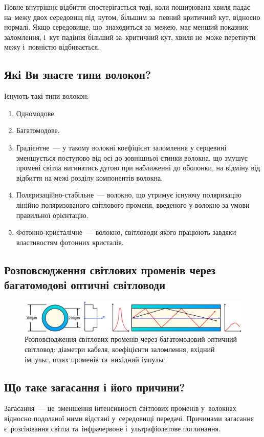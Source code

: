\documentclass[
	a4paper,
	oneside,
	BCOR = 10mm,
	DIV = 12,
	12pt,
	headings = normal,
]{scrartcl}
\begin{document}
			Повне внутрішнє відбиття спостерігається тоді, коли поширювана хвиля падає на~межу двох середовищ під~кутом, більшим за~певний критичний кут, відносно нормалі. Якщо середовище, що~знаходиться за~межею, має менший показник заломлення, і~кут падіння більший за~критичний кут, хвиля не~може перетнути межу і~повністю відбивається.

		\subsection{Які Ви знаєте типи волокон?}
			Існують такі типи волокон:
			\begin{enumerate}[noitemsep]
				\item Одномодове.
				\item Багатомодове.
				\item Градієнтне~— у такому волокні коефіцієнт заломлення у серцевині зменшується поступово від осі до зовнішньої стинки волокна, що змушує промені світла вигинатись дугою при наближенні до оболонки, на відміну від відбиття на межі розділу компонентів волокна.
				\item Поляризаційно-стабільне~— волокно, що утримує існуючу поляризацію лінійно поляризованого світлового променя, введеного у волокно за умови правильної орієнтацію.
				\item Фотонно-кристалічне~— волокно, світловоди якого працюють завдяки властивостям фотонних кристалів.
			\end{enumerate}

		\subsection{Розповсюдження світлових променів через багатомодові оптичні світловоди}
			\begin{figure}[!htbp]
				\centering
				\includegraphics[height = 4\baselineskip]{./assets/fibre-multimode.png}
				\caption{Розповсюдження світлових променів через багатомодовий оптичний світловод: діаметри кабеля, коефіцієнти заломлення, вхідний імпульс, шлях променів та~вихідний імпульс}
			\end{figure}

		\subsection{Що таке загасання і його причини?}
			Загасання~— це~зменшення інтенсивності світлових променів у~волокнах відносно подоланої ними відстані у~середовищі передачі. Причинами загасання є~розсіювання світла та~інфрачервоне і~ультрафіолетове поглинання.
\end{document}
